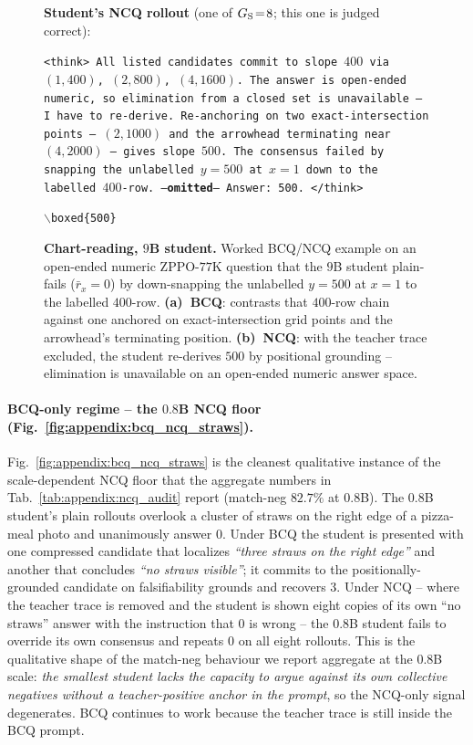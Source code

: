 \documentclass{llmxive}
\begin{document}
\begin{figure}[!p]
\begin{prompttemplatefig}
\textbf{Student's NCQ rollout} (one of $G_{\rm S}\!=\!8$; this one is judged correct):

\smallskip
\texttt{<think> All listed candidates commit to slope $400$ via $(1, 400)$, $(2, 800)$, $(4, 1600)$. The answer is open-ended numeric, so elimination from a closed set is unavailable -- I have to re-derive. Re-anchoring on two exact-intersection points -- $(2, 1000)$ and the arrowhead terminating near $(4, 2000)$ -- gives slope $500$. The consensus failed by snapping the unlabelled $y\!=\!500$ at $x\!=\!1$ down to the labelled $400$-row. ---\textbf{omitted}--- Answer: 500. </think>}

\smallskip
\texttt{$\backslash$boxed\{500\}} \quad \checkmark
\end{prompttemplatefig}

\caption{\textbf{Chart-reading, $9$B student.} Worked BCQ/NCQ example on an open-ended numeric ZPPO-$77$K question that the $9$B student plain-fails ($\bar{r}_x\!=\!0$) by down-snapping the unlabelled $y\!=\!500$ at $x\!=\!1$ to the labelled $400$-row. \textbf{(a)~BCQ}: contrasts that $400$-row chain against one anchored on exact-intersection grid points and the arrowhead's terminating position. \textbf{(b)~NCQ}: with the teacher trace excluded, the student re-derives $500$ by positional grounding -- elimination is unavailable on an open-ended numeric answer space.}
\label{fig:appendix:bcq_ncq_airplane}
\end{figure}


\paragraph{BCQ-only regime -- the \texorpdfstring{$0.8$}{0.8}B NCQ floor (Fig.~\ref{fig:appendix:bcq_ncq_straws}).}
Fig.~\ref{fig:appendix:bcq_ncq_straws} is the cleanest qualitative instance of the scale-dependent NCQ floor that the aggregate numbers in Tab.~\ref{tab:appendix:ncq_audit} report (match-neg $82.7\%$ at $0.8$B). The $0.8$B student's plain rollouts overlook a cluster of straws on the right edge of a pizza-meal photo and unanimously answer $0$. Under BCQ the student is presented with one compressed candidate that localizes \emph{``three straws on the right edge''} and another that concludes \emph{``no straws visible''}; it commits to the positionally-grounded candidate on falsifiability grounds and recovers $3$. Under NCQ -- where the teacher trace is removed and the student is shown eight copies of its own ``no straws'' answer with the instruction that $0$ is wrong -- the $0.8$B student fails to override its own consensus and repeats $\boxed{0}$ on all eight rollouts. This is the qualitative shape of the match-neg behaviour we report aggregate at the $0.8$B scale: \emph{the smallest student lacks the capacity to argue against its own collective negatives without a teacher-positive anchor in the prompt}, so the NCQ-only signal degenerates. BCQ continues to work because the teacher trace is still inside the BCQ prompt.
\end{document}
